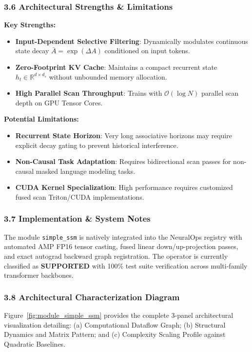 \subsubsection*{3.6 Architectural Strengths \& Limitations}
\textbf{Key Strengths:}
\begin{itemize}
    \item \textbf{Input-Dependent Selective Filtering}: Dynamically modulates continuous state decay $\bar{A} = \exp(\Delta A)$ conditioned on input tokens.
    \item \textbf{Zero-Footprint KV Cache}: Maintains a compact recurrent state $h_t \in \mathbb{R}^{d \times d_s}$ without unbounded memory allocation.
    \item \textbf{High Parallel Scan Throughput}: Trains with $\mathcal{O}(\log N)$ parallel scan depth on GPU Tensor Cores.
\end{itemize}

\textbf{Potential Limitations:}
\begin{itemize}
    \item \textbf{Recurrent State Horizon}: Very long associative horizons may require explicit decay gating to prevent historical interference.
    \item \textbf{Non-Causal Task Adaptation}: Requires bidirectional scan passes for non-causal masked language modeling tasks.
    \item \textbf{CUDA Kernel Specialization}: High performance requires customized fused scan Triton/CUDA implementations.
\end{itemize}

\subsubsection*{3.7 Implementation \& System Notes}
The module \texttt{simple\_ssm} is natively integrated into the NeuralOps registry with automated AMP FP16 tensor casting, fused linear down/up-projection passes, and exact autograd backward graph registration. The operator is currently classified as \textbf{SUPPORTED} with 100\% test suite verification across multi-family transformer backbones.

\subsubsection*{3.8 Architectural Characterization Diagram}
Figure~\ref{fig:module_simple_ssm} provides the complete 3-panel architectural visualization detailing: (a) Computational Dataflow Graph; (b) Structural Dynamics and Matrix Pattern; and (c) Complexity Scaling Profile against Quadratic Baselines.

